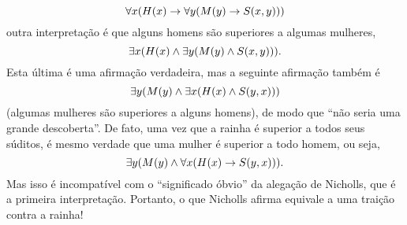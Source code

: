 \[
\forall x(\mathord{H}(x) \rightarrow \forall y(\mathord{M}(y) \rightarrow \mathord{S}(x,y)))
\]
outra interpretação é que alguns homens são superiores a algumas mulheres,
\[
\exists x(\mathord{H}(x) \wedge \exists y(\mathord{M}(y) \wedge \mathord{S}(x,y))).
\]
Esta última é uma afirmação verdadeira, mas a seguinte afirmação também é
\[
\exists y(\mathord{M}(y) \wedge \exists x(\mathord{H}(x) \wedge \mathord{S}(y,x)))
\]
(algumas mulheres são superiores a alguns homens), de modo que ``não seria uma grande descoberta''.
De fato, uma vez que a rainha é superior a todos seus súditos, é mesmo verdade que uma mulher é superior a todo homem, ou seja,
\[
\exists y(\mathord{M}(y) \land \forall x(\mathord{H}(x) \rightarrow \mathord{S}(y,x))).
\]
Mas isso é incompatível com o ``significado óbvio'' da alegação de Nicholls, que é a primeira interpretação.
Portanto, o que Nicholls afirma equivale a uma traição contra a rainha!


